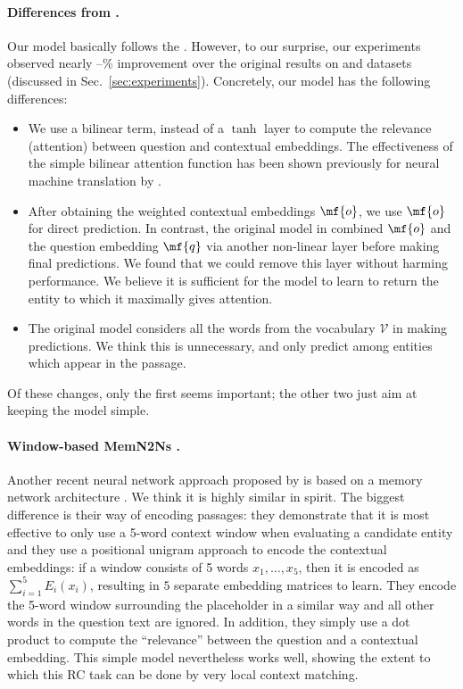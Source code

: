 \paragraph*{Differences from \cite{hermann2015teaching}.}
Our model basically follows the . However, to our surprise, our experiments observed nearly  --\% improvement over the original  results on  and  datasets (discussed in Sec.~\ref{sec:experiments}). Concretely, our model has the following differences:
\begin{itemize}
\item
We use a bilinear term, instead of a $\tanh$ layer to compute the relevance (attention) between question and contextual embeddings. The effectiveness of the simple bilinear attention function has been shown previously for neural machine translation by \cite{luong2015effective}.
\item
After obtaining the weighted contextual embeddings $\mf{o}$, we use $\mf{o}$ for direct prediction. In contrast, the original model in \cite{hermann2015teaching} combined $\mf{o}$ and the question embedding $\mf{q}$ via another non-linear layer before making final predictions. We found that we could remove this layer without harming performance. We believe it is sufficient for the model to learn to return the entity to which it maximally gives attention.
\item
The original model considers all the words from the vocabulary $\mathcal{V}$ in making predictions. We think this is unnecessary, and only predict among entities which appear in the passage.
\end{itemize}
Of these changes, only the first seems important; the other two just aim at keeping the model simple.

\paragraph*{Window-based MemN2Ns \cite{hill2016goldilocks}.}
Another recent neural network approach proposed by \cite{hill2016goldilocks} is based on a memory network architecture \cite{weston2015memory}. We think it is highly similar in spirit. The biggest difference is their way of encoding passages: they demonstrate that it is most effective to only use a 5-word context window when evaluating a candidate entity and they use a positional unigram approach to encode the contextual embeddings: if a window consists of 5 words $x_1, \ldots, x_5$, then it is encoded as $\sum_{i=1}^{5}{E_i(x_i)}$, resulting in $5$ separate embedding matrices to learn. They encode the 5-word window surrounding the placeholder in a similar way and all other words in the question text are ignored. In addition, they simply use a dot product to compute the ``relevance'' between the question and a contextual embedding. This simple model nevertheless works well, showing the extent to which this RC task can be done by very local context matching.
